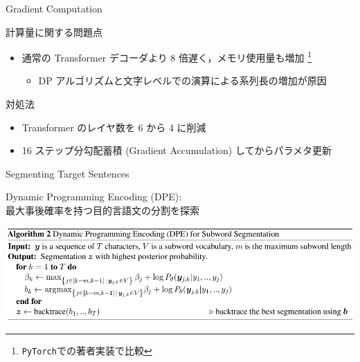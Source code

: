 \documentclass[unicode, 12pt, xdvipdfmx, aspectratio=43]{beamer}
\begin{document}
\begin{frame}[label={sec:org029c38a}]{Gradient Computation}
\begin{block}{計算量に関する問題点}
\begin{itemize}
\item 通常の Transformer デコーダより 8 倍遅く，メモリ使用量も増加 \footnote{\texttt{PyTorch}での著者実装で比較}
\begin{itemize}
\item DP アルゴリズムと文字レベルでの演算による系列長の増加が原因
\end{itemize}
\end{itemize}
\end{block}

\begin{block}{対処法}
\begin{itemize}
\item Transformer のレイヤ数を 6 から 4 に削減
\item 16 ステップ分勾配蓄積 \textrm{(Gradient Accumulation)} してからパラメタ更新
\end{itemize}
\vspace{0.5cm}
\end{block}
\end{frame}

\begin{frame}[label={sec:orgb5d62a1}]{Segmenting Target Sentences}
\begin{block}{Dynamic Programming Encoding (DPE): \\ 最大事後確率を持つ目的言語文の分割を探索}
\begin{center}
\includegraphics[width=\linewidth]{./figure/Algorithm2.pdf}
\end{center}
\end{block}
\end{frame}
\end{document}
